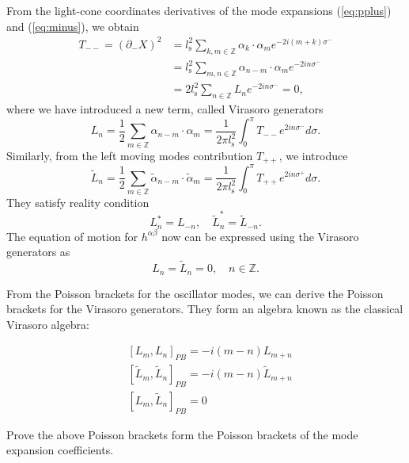 \documentclass[graybox,envcountchap,sectrefs]{svmono}
\begin{document}
From the light-cone coordinates derivatives of the mode expansions (\ref{eq:pplus}) and (\ref{eq:minus}), we obtain
\begin{align}
T_{--}=(\partial_{-}X)^2&=l_{\mathrm{s}}^2\sum_{k,m\in \mathbb{Z}}\alpha_{k}\cdot\alpha_{m}e^{-2i(m+k)\sigma^-}\nonumber\\
&=l_{\mathrm{s}}^2\sum_{m,n\in \mathbb{Z}}\alpha_{n-m}\cdot\alpha_{m}e^{-2in\sigma^-}\nonumber\\
&=2l_{\mathrm{s}}^2\sum_{n\in\mathbb{Z}}L_ne^{-2in\sigma^-}=0,
\end{align}
where we have introduced a new term, called Virasoro generators
\begin{equation}
L_n=\frac{1}{2}\sum_{m\in\mathbb{Z}}\alpha_{n-m}\cdot\alpha_{m}=\frac{1}{2\pi l_{\mathrm{s}}^2}\int_{0}^{\pi}T_{--}e^{2in\sigma^-}d\sigma.
\end{equation}
Similarly, from the left moving modes contribution $T_{++}$, we introduce
\begin{equation}
\tilde{L}_n=\frac{1}{2}\sum_{m\in\mathbb{Z}}\tilde{\alpha}_{n-m}\cdot \tilde{\alpha}_{m}=\frac{1}{2\pi l_{\mathrm{s}}^2}\int_{0}^{\pi}T_{++}e^{2in\sigma^+}d\sigma.
\end{equation}
They satisfy reality condition
\begin{equation}
L_n^*=L_{-n},\quad \tilde{L}_n^*=\tilde{L}_{-n}.	
\end{equation}
The equation of motion for $h^{\alpha\beta}$ now can be expressed using the Virasoro generators as
\begin{equation}
L_n=\tilde{L}_n=0,\quad n\in \mathbb{Z}.
\end{equation}

From the Poisson brackets for the oscillator modes, we can derive the Poisson brackets for the Virasoro generators. They form an algebra known as the classical Virasoro algebra: 
\begin{svgraybox} 
\begin{align}
&[L_{m}, L_{n}]_{P B}=-i(m-n) L_{m+n}\\
&[\tilde{L}_{m}, \tilde{L}_{n}]_{P B}=-i(m-n) \tilde{L}_{m+n}\\
&[L_{m}, \tilde{L}_{n}]_{P B}=0
\end{align}
\end{svgraybox}
\begin{exercise}
Prove the above Poisson brackets form the Poisson brackets of the mode expansion coefficients.	
\end{exercise}
\end{document}
